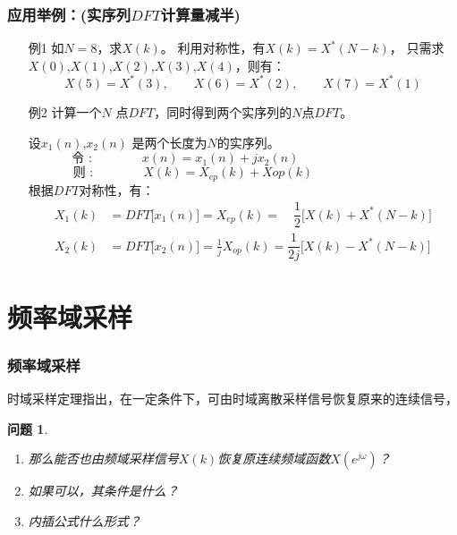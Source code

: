 \documentclass[notheorems,compress,mathserif,table]{beamer}
\newtheorem{wenti}{问题}
\begin{document}
\begin{frame}[allowframebreaks]\frametitle{ 应用举例：(实序列$DFT$计算量减半)}%

      \begin{enumerate}
        \item [例1] 如$N=8$，求$X(k)$。 \quad\newline\newline\quad
              利用对称性，有$X(k)=X^*(N-k)$，\quad\newline\newline\quad
              只需求$X(0)$,$X(1)$,$X(2)$,$X(3)$,$X(4)$，则有：
              $$X(5)=X^*(3),\quad\quad X(6)=X^*(2),\quad\quad X(7)= X^*(1)$$
        \newpage
        \item [例2] 计算一个$N$ 点$DFT$，同时得到两个实序列的$N$点$DFT$。
        
        \quad\newline\quad
              设$x_1(n)$,$x_2(n)$ 是两个长度为$N$的实序列。
              $$\mbox{令 :}\qquad\qquad x(n) = x_1(n)+jx_2(n)\quad\:
              \qquad\qquad\qquad\qquad$$
              $$\mbox{则 :}\qquad\qquad X(k) = X_{ep}(k) +X{op}(k)
              \qquad\qquad\qquad\qquad$$
              根据$DFT$对称性，有：
              \begin{equation*}
                \begin{split}
                X_1(k)  &= DFT\big[x_1(n)\big]   = X_{ep}(k) = \quad \dfrac{1}{2} \bigg[X(k) + X^{*}(N-k)\bigg]  \\
                X_2(k)  &= DFT\big[x_2(n)\big]   = \frac{1}{j}X_{op}(k) = \dfrac{1}{2j}\bigg[X(k) - X^{*}(N-k)\bigg]
                \end{split}
              \end{equation*}
      \end{enumerate}


\end{frame}


\section{频率域采样}
\begin{frame}[shrink]\frametitle{频率域采样}%


时域采样定理指出，在一定条件下，可由时域离散采样信号恢复原来的连续信号，

\begin{wenti}
\begin{enumerate}
	\item 那么能否也由频域采样信号$ X(k) $恢复原连续频域函数$ X(e^{j\omega}) $？%
	\item 如果可以，其条件是什么？
	\item 内插公式什么形式？
\end{enumerate}
\end{wenti}
\end{frame}
\end{document}
